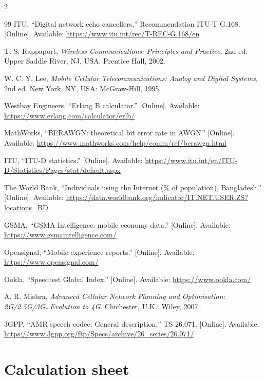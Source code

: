 \documentclass[9pt,a4paper]{article}
\begin{document}
\begin{multicols}{2}
\begin{thebibliography}{99}
 ITU, ``Digital network echo cancellers,'' Recommendation ITU-T G.168. [Online].
Available: \url{https://www.itu.int/rec/T-REC-G.168/en}

 T. S. Rappaport, \emph{Wireless Communications: Principles and Practice},
2nd ed. Upper Saddle River, NJ, USA: Prentice Hall, 2002.

 W. C. Y. Lee, \emph{Mobile Cellular Telecommunications: Analog and Digital
Systems}, 2nd ed. New York, NY, USA: McGraw-Hill, 1995.

 Westbay Engineers, ``Erlang B calculator.'' [Online]. Available:
\url{https://www.erlang.com/calculator/erlb/}

 MathWorks, ``BERAWGN: theoretical bit error rate in AWGN.'' [Online].
Available: \url{https://www.mathworks.com/help/comm/ref/berawgn.html}

 ITU, ``ITU-D statistics.'' [Online]. Available:
\url{https://www.itu.int/en/ITU-D/Statistics/Pages/stat/default.aspx}

 The World Bank, ``Individuals using the Internet (\% of population),
Bangladesh.'' [Online]. Available:
\url{https://data.worldbank.org/indicator/IT.NET.USER.ZS?locations=BD}

 GSMA, ``GSMA Intelligence: mobile economy data.'' [Online]. Available:
\url{https://www.gsmaintelligence.com/}

 Opensignal, ``Mobile experience reports.'' [Online]. Available:
\url{https://www.opensignal.com/}

 Ookla, ``Speedtest Global Index.'' [Online]. Available:
\url{https://www.ookla.com/}

 A. R. Mishra, \emph{Advanced Cellular Network Planning and Optimisation:
2G/2.5G/3G\ldots Evolution to 4G}. Chichester, U.K.: Wiley, 2007.

 3GPP, ``AMR speech codec; General description,'' TS 26.071. [Online]. Available:
\url{https://www.3gpp.org/ftp/Specs/archive/26_series/26.071/}

\end{thebibliography}
\end{multicols}

\appendix
\section{Calculation sheet}
\label{app:calc}
\end{document}
